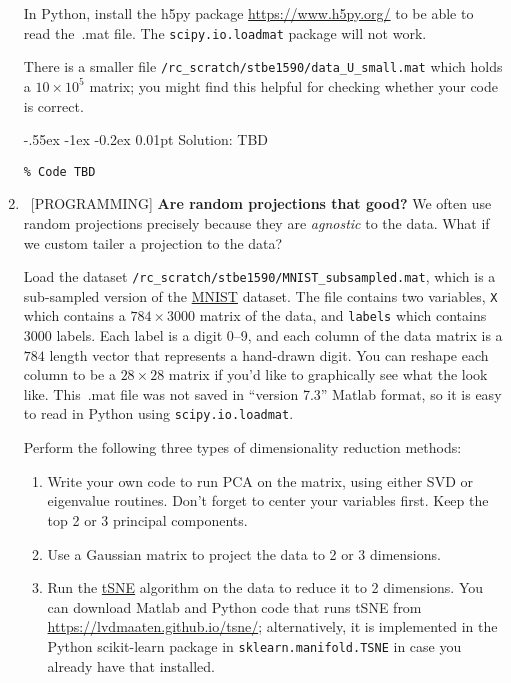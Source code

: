 \documentclass[10pt, letterpaper]{scrartcl}
\makeatletter
\newlength{\savedparindent}
\newcommand\solParagraph{\@startsection{paragraph}{4}{\z@}%
    {-.55ex \@plus -1ex \@minus -0.2ex}%
    {0.01pt}%
    {\raggedsection\normalfont\sectfont\nobreak\size@paragraph}%
}
\newenvironment{solution}{\setlength{\parindent}{\savedparindent}\solParagraph{Solution:}}{}
\makeatother
\begin{document}
\begin{enumerate}[align=left, leftmargin=*, label=\bfseries Problem \arabic*:]
    In Python, install the h5py package \url{https://www.h5py.org/} to be able to read the\ .mat file. The \texttt{scipy.io.loadmat} package will not work.
    
    There is a smaller file \texttt{/rc\_scratch/stbe1590/data\_U\_small.mat} which holds a  $10 \times 10^5$ matrix;  you might find this helpful for checking whether your code is correct.

    
\begin{solution}
TBD
\begin{lstlisting}
% Code TBD
\end{lstlisting}
\end{solution}


   \item \ [PROGRAMMING] \textbf{Are random projections that good?}  We often use random projections precisely because they are \emph{agnostic} to the data. What if we custom tailer a projection to the data?

Load the dataset \texttt{/rc\_scratch/stbe1590/MNIST\_subsampled.mat}, which is a sub-sampled version of the \href{https://en.wikipedia.org/wiki/MNIST_database}{MNIST} dataset. The file contains two variables, \texttt{X} which contains a $784 \times 3000$ matrix of the data, and \texttt{labels} which contains $3000$ labels. Each label is a digit 0--9, and each column of the data matrix is a $784$ length vector that represents a hand-drawn digit. You can reshape each column to be a $28 \times 28$ matrix if you'd like to graphically see what the look like.  This\ .mat file was not saved in ``version 7.3'' Matlab format, so it is easy to read in Python using \texttt{scipy.io.loadmat}.

Perform the following three types of dimensionality reduction methods:
\begin{enumerate}
    \item Write your own code to run PCA on the matrix, using either SVD or eigenvalue routines. Don't forget to center your variables first. Keep the top 2 or 3 principal components.
    \item Use a Gaussian matrix to project the data to 2 or 3 dimensions.
    \item Run the \href{https://en.wikipedia.org/wiki/T-distributed_stochastic_neighbor_embedding}{tSNE} algorithm on the data to reduce it to 2 dimensions. You can download Matlab and Python code that runs tSNE from \url{https://lvdmaaten.github.io/tsne/}; alternatively, it is implemented in the Python scikit-learn package in \texttt{sklearn.manifold.TSNE} in case you already have that installed.
\end{enumerate}


\end{enumerate}
\end{document}
